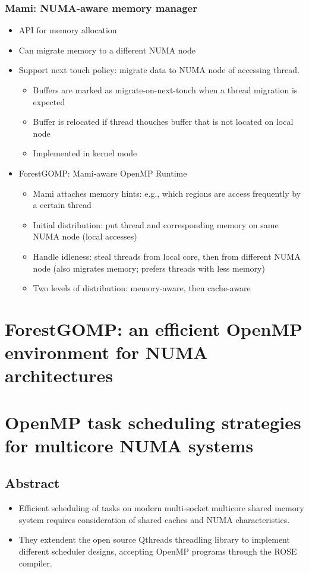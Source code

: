 \documentclass[11pt]{article}
\begin{document}
\subsubsection{Mami: NUMA-aware memory manager}
\label{sec-2-3-2}
\begin{itemize}
\item API for memory allocation
\item Can migrate memory to a different NUMA node
\item Support next touch policy: migrate data to NUMA node of accessing thread.
\begin{itemize}
\item Buffers are marked as migrate-on-next-touch when a thread migration is expected
\item Buffer is relocated if thread thouches buffer that is not located on local node
\item Implemented in kernel mode
\end{itemize}
\item ForestGOMP: Mami-aware OpenMP Runtime
\begin{itemize}
\item Mami attaches memory hints: e.g., which regions are access frequently by a certain thread
\item Initial distribution: put thread and corresponding memory on same NUMA node (local accesses)
\item Handle idleness: steal threads from local core, then from different NUMA node (also migrates memory; prefers threads with less memory)
\item Two levels of distribution: memory-aware, then cache-aware
\end{itemize}
\end{itemize}
\section{ForestGOMP: an efficient OpenMP environment for NUMA architectures \cite{broquedis10_fores}}
\label{sec-3}
\section{OpenMP task scheduling strategies for multicore NUMA systems \cite{olivier12_openm_task_sched_strat_multic_numa_system}}
\label{sec-4}
\subsection{Abstract}
\label{sec-4-1}
\begin{itemize}
\item Efficient scheduling of tasks on modern multi-socket multicore shared memory system requires consideration of shared caches and NUMA characteristics.
\item They extendent the open source Qthreads threadling library to implement different scheduler designs, accepting OpenMP programs through the ROSE compiler.
\end{itemize}
\end{document}
